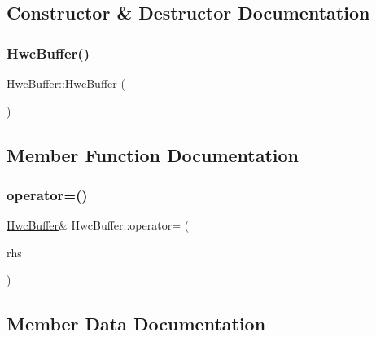 \subsection{Constructor \& Destructor Documentation}
\mbox{\label{structHwcBuffer_a51e8350e17e2fa84730c1b4feb83e33b}} 
\subsubsection{\texorpdfstring{Hwc\+Buffer()}{HwcBuffer()}}
{\footnotesize\ttfamily Hwc\+Buffer\+::\+Hwc\+Buffer (\begin{DoxyParamCaption}{ }\end{DoxyParamCaption})\hspace{0.3cm}{\ttfamily [default]}}



\subsection{Member Function Documentation}
\mbox{\label{structHwcBuffer_a052afdbba36b220c5053ebb9c54992ce}} 
\subsubsection{\texorpdfstring{operator=()}{operator=()}}
{\footnotesize\ttfamily \mbox{\hyperlink{structHwcBuffer}{Hwc\+Buffer}}\& Hwc\+Buffer\+::operator= (\begin{DoxyParamCaption}\item[{const \mbox{\hyperlink{structHwcBuffer}{Hwc\+Buffer}} \&}]{rhs }\end{DoxyParamCaption})\hspace{0.3cm}{\ttfamily [delete]}}



\subsection{Member Data Documentation}
\mbox{\label{structHwcBuffer_ad16028811f8af57430b65129bf7ae67a}} 
